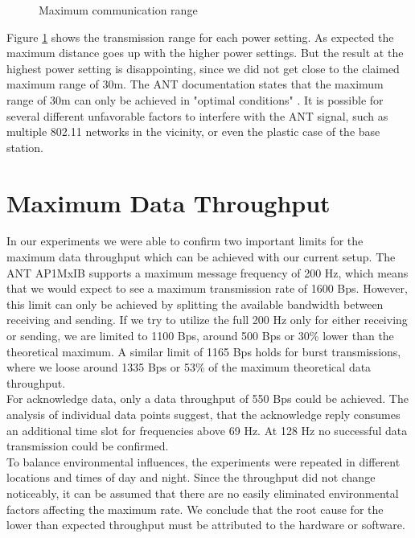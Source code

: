 \begin{description}
\begin{figure}[H]
		\caption{Maximum communication range}\label{fig:exp6}
	\end{figure}
	Figure \ref{fig:exp6} shows the transmission range for each power setting. As expected the maximum distance goes up with the higher power settings. But the result at the highest power setting is disappointing, since we did not get close to the claimed maximum range of 30m. The ANT documentation states that the maximum range of 30m can only be achieved in "optimal conditions" \cite{DynastreamInnovationsInc.2013}. It is possible for several different unfavorable factors to interfere with the ANT signal, such as multiple 802.11 networks in the vicinity, or even the plastic case of the base station. 
\end{description}

\newpage
\section{Maximum Data Throughput}
\label{sec:dataThrougput}

In our experiments we were able to confirm two important limits for the maximum data throughput which can be achieved with our current setup. The ANT AP1MxIB supports a maximum message frequency of 200 Hz, which means that we would expect to see a maximum transmission rate of 1600 Bps.
However, this limit can only be achieved by splitting the available bandwidth between receiving and sending. If we try to utilize the full 200 Hz only for either receiving or sending, we are limited to 1100 Bps, around 500 Bps or 30\% lower than the theoretical maximum. A similar limit of 1165 Bps holds for burst transmissions, where we loose around 1335 Bps or 53\% of the maximum theoretical data throughput.\\

For acknowledge data, only a data throughput of 550 Bps could be achieved. The analysis of individual data points suggest, that the acknowledge reply consumes an additional time slot for frequencies above 69 Hz. At 128 Hz no successful data transmission could be confirmed.\\

To balance environmental influences, the experiments were repeated in different locations and times of day and night. Since the throughput did not change noticeably, it can be assumed that there are no easily eliminated environmental factors affecting the maximum rate. We conclude that the root cause for the lower than expected throughput must be attributed to the hardware or software. \\

